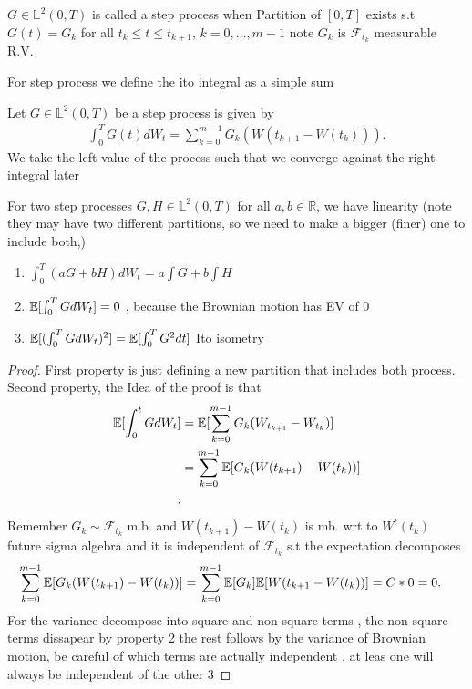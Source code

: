 \begin{definition}
  $G \in  \mathbb{L}^2(0,T)$  is called a step process when Partition of $[0,T]$ exists 
  s.t $G(t) = G_k$ for all $t_k \le  t \le t_{k+1}$, $k=0,\ldots ,m-1$ note $G_k$ is $\mathcal{F}_{t_k}$ measurable R.V.
\end{definition}
For step process we define the ito integral as a simple sum 
\begin{definition}
 Let $G \in  \mathbb{L}^2(0,T)$ be a step process  is given by 
 \begin{align*}
   \int_0^{T}  G(t) dW_t = \sum_{k=0}^{m-1}  G_k(W(t_{k+1}-W(t_k)))
 .\end{align*}
 We take the left value of the process such that we converge against the right integral later
\end{definition}
\begin{remark}
 For two step processes $G,H \in  \mathbb{L}^2(0,T)$  for all $a,b \in  \mathbb{R}$,
 we have linearity (note they may have two different partitions, so we need to make a bigger (finer) one to include both,)\\[1ex]
 \begin{enumerate}
   \item $\int_0^{T} (aG+bH) dW_t = a\int G + b \int  H$ 
   \item $\mathbb{E}[\int_0^{T} G dW_t] = 0$ , because the Brownian motion has EV of 0
   \item $\mathbb{E}[(\int_0^{T} G dW_t )^2 ]= \mathbb{E}[\int_{0}^{T}G^2 dt ]$  Ito isometry
 \end{enumerate}
\end{remark}
\begin{proof}
  First property is just defining a new partition that includes both process.
  Second property, the Idea of the proof is that
  \begin{align*}
    \mathbb{E}[\int_0^{t} G d W_t ] &= \mathbb{E}[\sum_{k=0}^{m-1}G_k(W_{t_{k+1}}-W_{t_k}) ]  \\
                            &= \sum_{k=0}^{m-1}\mathbb{E}[G_k(W(t_{k+1})-W(t_k))]  \\
  .\end{align*}
  Remember $G_k \sim \mathcal{F}_{t_k}$ m.b. and $W(t_{k+1}) - W(t_k)$ is mb. wrt to $W^{t}(t_k) $ future sigma algebra
  and it is independent of $\mathcal{F}_{t_k}$ s.t the expectation decomposes 
  \begin{align*}
    \sum_{k=0}^{m-1}\mathbb{E}[G_k(W(t_{k+1})-W(t_k))]  &= \sum_{k=0}^{m-1} \mathbb{E}[G_k]\mathbb{E}[W(t_{k+1}-W(t_{k}))]  = C*0 = 0 
  .\end{align*}
  For the variance decompose into square and non square terms , the non square terms dissapear by property 2 the rest follows by the variance of 
  Brownian motion, be careful of which terms are actually independent , at leas one will always be independent of the other 3
\end{proof}
